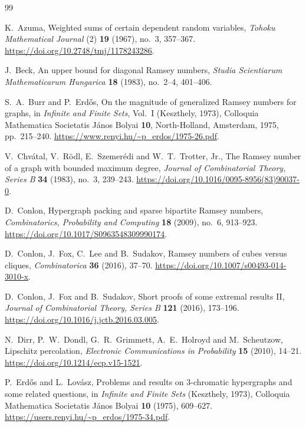 \begin{thebibliography}{99}

K.~Azuma,
Weighted sums of certain dependent random variables,
\emph{Tohoku Mathematical Journal}
(2) \textbf{19} (1967), no.~3, 357--367.
\url{https://doi.org/10.2748/tmj/1178243286}.

J.~Beck,
An upper bound for diagonal Ramsey numbers,
\emph{Studia Scientiarum Mathematicarum Hungarica}
\textbf{18} (1983), no.~2--4, 401--406.

S.~A.~Burr and P.~Erd\H{o}s,
On the magnitude of generalized Ramsey numbers for graphs,
in \emph{Infinite and Finite Sets}, Vol.~I (Keszthely, 1973),
Colloquia Mathematica Societatis J\'anos Bolyai \textbf{10},
North-Holland, Amsterdam, 1975, pp.~215--240.
\url{https://www.renyi.hu/~p_erdos/1975-26.pdf}.

V.~Chv\'atal, V.~R\"odl, E.~Szemer\'edi and W.~T.~Trotter, Jr.,
The Ramsey number of a graph with bounded maximum degree,
\emph{Journal of Combinatorial Theory, Series B}
\textbf{34} (1983), no.~3, 239--243.
\url{https://doi.org/10.1016/0095-8956(83)90037-0}.

D.~Conlon,
Hypergraph packing and sparse bipartite Ramsey numbers,
\emph{Combinatorics, Probability and Computing}
\textbf{18} (2009), no.~6, 913--923.
\url{https://doi.org/10.1017/S0963548309990174}.

D.~Conlon, J.~Fox, C.~Lee and B.~Sudakov,
Ramsey numbers of cubes versus cliques,
\emph{Combinatorica} \textbf{36} (2016), 37--70.
\url{https://doi.org/10.1007/s00493-014-3010-x}.

D.~Conlon, J.~Fox and B.~Sudakov,
Short proofs of some extremal results II,
\emph{Journal of Combinatorial Theory, Series B} \textbf{121}
(2016), 173--196.
\url{https://doi.org/10.1016/j.jctb.2016.03.005}.

N.~Dirr, P.~W.~Dondl, G.~R.~Grimmett, A.~E.~Holroyd and M.~Scheutzow,
Lipschitz percolation,
\emph{Electronic Communications in Probability} \textbf{15} (2010), 14--21.
\url{https://doi.org/10.1214/ecp.v15-1521}.

P.~Erd\H{o}s and L.~Lov\'asz,
Problems and results on \(3\)-chromatic hypergraphs and some related questions,
in \emph{Infinite and Finite Sets} (Keszthely, 1973),
Colloquia Mathematica Societatis J\'anos Bolyai \textbf{10} (1975), 609--627.
\url{https://users.renyi.hu/~p_erdos/1975-34.pdf}.


\end{thebibliography}
